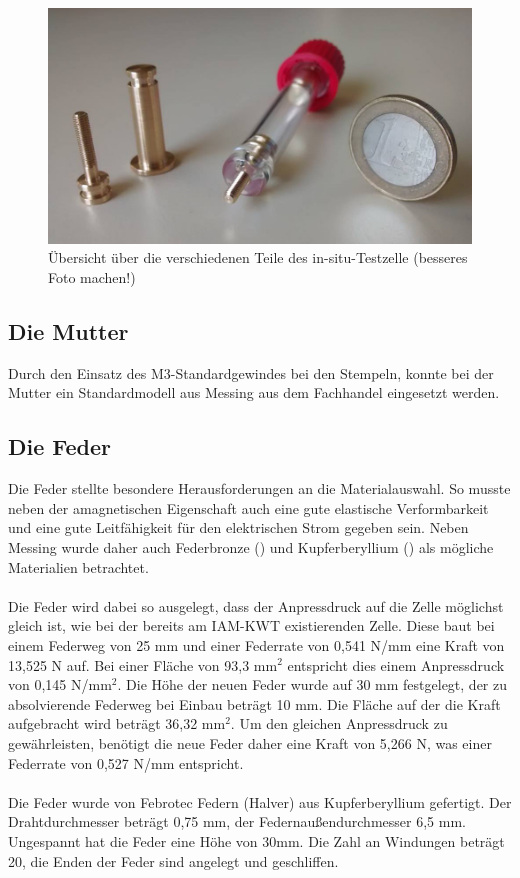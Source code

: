 \documentclass[a4paper, 11pt, headsepline,footsepline,twoside,abstract]{scrbook}
\begin{document}
\begin{figure}
	\centering
	\includegraphics[width=1.0\columnwidth]{images/Stempel_Foto_cutted.jpg}
	\caption{Übersicht über die verschiedenen Teile des in-situ-Testzelle (besseres Foto machen!)}
	\label{uebersicht_teile}
\end{figure}
\subsection{Die Mutter}
Durch den Einsatz des M3-Standardgewindes bei den Stempeln, konnte bei der Mutter ein Standardmodell aus Messing aus dem Fachhandel eingesetzt werden.
\subsection{Die Feder}
Die Feder stellte besondere Herausforderungen an die Materialauswahl. So musste neben der amagnetischen Eigenschaft auch eine gute elastische Verformbarkeit und eine gute Leitfähigkeit für den elektrischen Strom gegeben sein. Neben Messing wurde daher auch Federbronze () und Kupferberyllium () als mögliche Materialien betrachtet.
\\\\
Die Feder wird dabei so ausgelegt, dass der Anpressdruck auf die Zelle möglichst gleich ist, wie bei der bereits am IAM-KWT existierenden Zelle. Diese baut bei einem Federweg von 25 mm und einer Federrate von 0,541 N/mm eine Kraft von 13,525 N auf. Bei einer Fläche von 93,3 mm$^2$ entspricht dies einem Anpressdruck von 0,145 N/mm$^2$. Die Höhe der neuen Feder wurde auf 30 mm festgelegt, der zu absolvierende Federweg bei Einbau beträgt 10 mm. Die Fläche auf der die Kraft aufgebracht wird beträgt 36,32 mm$^2$. Um den gleichen Anpressdruck zu gewährleisten, benötigt die neue Feder daher eine Kraft von 5,266 N, was einer Federrate von 0,527 N/mm entspricht.
\\\\
Die Feder wurde von Febrotec Federn (Halver) aus Kupferberyllium gefertigt. Der Drahtdurchmesser beträgt 0,75 mm, der Federnaußendurchmesser 6,5 mm. Ungespannt hat die Feder eine Höhe von 30mm. Die Zahl an Windungen beträgt 20, die Enden der Feder sind angelegt und geschliffen. %
\end{document}

